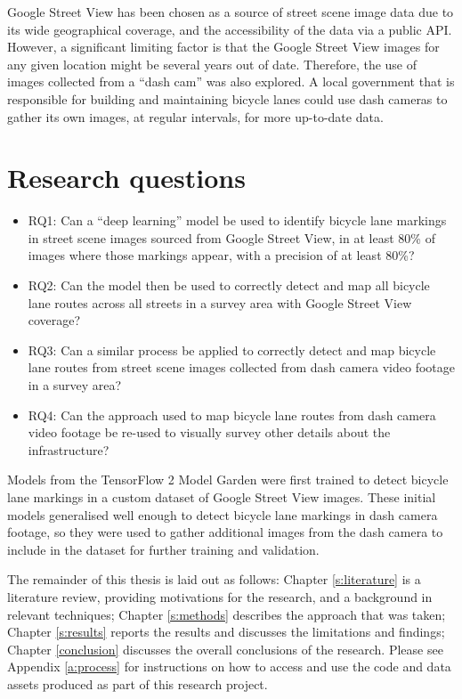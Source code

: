 \documentclass[11pt,twoside]{report}
\begin{document}
Google Street View has been chosen as a source of street scene image data due to its wide geographical coverage, and the accessibility of the data via a public API.  However, a significant limiting factor is that the Google Street View images for any given location might be several years out of date.  Therefore, the use of images collected from a ``dash cam'' was also explored.  A local government that is responsible for building and maintaining bicycle lanes could use dash cameras to gather its own images, at regular intervals, for more up-to-date data.

\section{Research questions}
\begin{itemize}
\item{RQ1: Can a ``deep learning'' model be used to identify bicycle lane markings in street scene images sourced from Google Street View, in at least 80\% of images where those markings appear, with a precision of at least 80\%?}
\item{RQ2: Can the model then be used to correctly detect and map all bicycle lane routes across all streets in a survey area with Google Street View coverage?}
\item{RQ3: Can a similar process be applied to correctly detect and map bicycle lane routes from street scene images collected from dash camera video footage in a survey area?}
\item{RQ4: Can the approach used to map bicycle lane routes from dash camera video footage be re-used to visually survey other details about the infrastructure?}
\end{itemize}

Models from the TensorFlow 2 Model Garden were first trained to detect bicycle lane markings in a custom dataset of Google Street View images.  These initial models generalised well enough to detect bicycle lane markings in dash camera footage, so they were used to gather additional images from the dash camera to include in the dataset for further training and validation.

The remainder of this thesis is laid out as follows:  Chapter \ref{s:literature} is a literature review, providing motivations for the research, and a background in relevant techniques;  Chapter \ref{s:methods} describes the approach that was taken;  Chapter \ref{s:results} reports the results and discusses the limitations and findings;  Chapter \ref{conclusion} discusses the overall conclusions of the research.  Please see Appendix \ref{a:process} for instructions on how to access and use the code and data assets produced as part of this research project.
\end{document}
